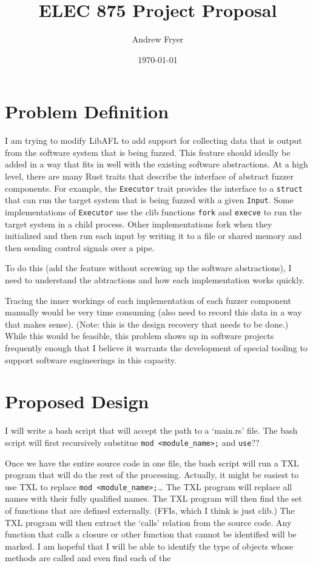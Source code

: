\documentclass[11pt]{article}
\title{ELEC 875 Project Proposal}
\author{Andrew Fryer}
\date{\today}
\begin{document}
\maketitle

\section{Problem Definition}

I am trying to modify LibAFL to add support for collecting data that is output from the software system that is being fuzzed.
This feature should ideally be added in a way that fits in well with the existing software abstractions.
At a high level, there are many Rust traits that describe the interface of abstract fuzzer components.
For example, the \lstinline{Executor} trait provides the interface to a \lstinline{struct} that can run the target system that is being fuzzed with a given \lstinline{Input}.
Some implementations of \lstinline{Executor} use the clib functions \lstinline{fork} and \lstinline{execve} to run the target system in a child process.
Other implementations fork when they initialized and then run each input by writing it to a file or shared memory and then sending control signals over a pipe.

To do this (add the feature without screwing up the software abstractions), I need to understand the abtractions and how each implementation works quickly.

Tracing the inner workings of each implementation of each fuzzer component manually would be very time consuming (also need to record this data in a way that makes sense).
(Note: this is the design recovery that needs to be done.)
While this would be feasible, this problem shows up in software projects frequently enough that I believe it warrants the development of special tooling to support software engineerings in this capacity.

\section{Proposed Design}

I will write a bash script that will accept the path to a `main.rs' file.
The bash script will first recursively substitue \lstinline{mod <module_name>;} and \lstinline{use}??

Once we have the entire source code in one file, the bash script will run a TXL program that will do the rest of the processing.
Actually, it might be easiest to use TXL to replace \lstinline{mod <module_name>;}\dots
The TXL program will replace all names with their fully qualified names.
The TXL program will then find the set of functions that are defined externally. (FFIs, which I think is just clib.)
The TXL program will then extract the `calls' relation from the source code.
Any function that calls a closure or other function that cannot be identified will be marked.
I am hopeful that I will be able to identify the type of objects whose methods are called and even find each of the 
\end{document}
